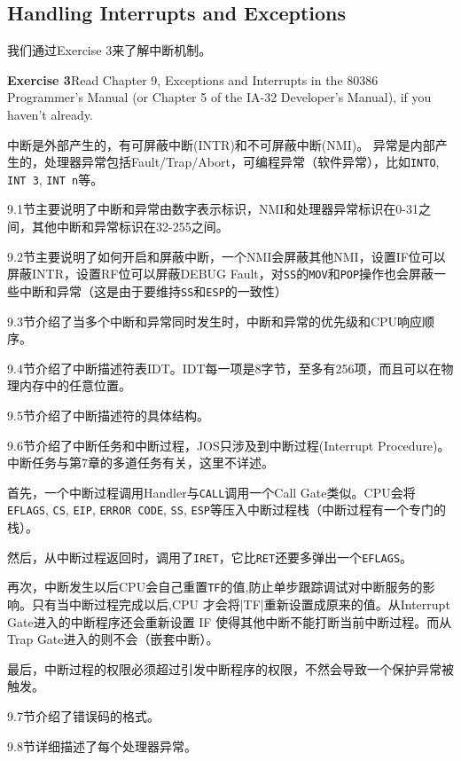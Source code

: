 \documentclass[11pt]{article}
\begin{document}
\subsection{Handling Interrupts and Exceptions}
我们通过Exercise 3来了解中断机制。
\begin{framed}
\noindent\textbf{Exercise 3}Read Chapter 9, Exceptions and Interrupts in the 80386 Programmer's Manual (or Chapter 5 of the IA-32 Developer's Manual), if you haven't already. 
\end{framed}
中断是外部产生的，有可屏蔽中断(INTR)和不可屏蔽中断(NMI)。
异常是内部产生的，处理器异常包括Fault/Trap/Abort，可编程异常（软件异常），比如\lstinline|INTO|, \lstinline|INT 3|, \lstinline|INT n|等。

9.1节主要说明了中断和异常由数字表示标识，NMI和处理器异常标识在0-31之间，其他中断和异常标识在32-255之间。

9.2节主要说明了如何开启和屏蔽中断，一个NMI会屏蔽其他NMI，设置IF位可以屏蔽INTR，设置RF位可以屏蔽DEBUG Fault，对\lstinline|SS|的\lstinline|MOV|和\lstinline|POP|操作也会屏蔽一些中断和异常（这是由于要维持\lstinline|SS|和\lstinline|ESP|的一致性）

9.3节介绍了当多个中断和异常同时发生时，中断和异常的优先级和CPU响应顺序。

9.4节介绍了中断描述符表IDT。IDT每一项是8字节，至多有256项，而且可以在物理内存中的任意位置。

9.5节介绍了中断描述符的具体结构。

9.6节介绍了中断任务和中断过程，JOS只涉及到中断过程(Interrupt Procedure)。中断任务与第7章的多道任务有关，这里不详述。

首先，一个中断过程调用Handler与\lstinline|CALL|调用一个Call Gate类似。CPU会将\lstinline|EFLAGS|, \lstinline|CS|, \lstinline|EIP|, \lstinline|ERROR CODE|, \lstinline|SS|, \lstinline|ESP|等压入中断过程栈（中断过程有一个专门的栈）。

然后，从中断过程返回时，调用了\lstinline|IRET|，它比\lstinline|RET|还要多弹出一个\lstinline|EFLAGS|。

再次，中断发生以后CPU会自己重置\lstinline|TF|的值,防止单步跟踪调试对中断服务的影响。只有当中断过程完成以后,CPU 才会将\lstinlie|TF|重新设置成原来的值。从Interrupt Gate进入的中断程序还会重新设置 IF 使得其他中断不能打断当前中断过程。而从Trap Gate进入的则不会（嵌套中断）。

最后，中断过程的权限必须超过引发中断程序的权限，不然会导致一个保护异常被触发。

9.7节介绍了错误码的格式。

9.8节详细描述了每个处理器异常。
\end{document}

